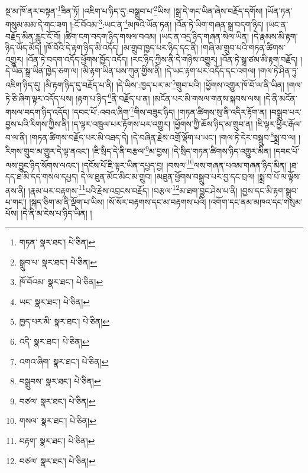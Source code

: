 སྔ་མ་ཁོ་ནར་བསྟན་\footnote{གཏན་  སྣར་ཐང་།  པེ་ཅིན། }ཟིན་ཏོ། །འཇིག་པ་ཉིད་དུ་:བསྒྲུབ་པ་\footnote{སྒྲུབ་པ་  སྣར་ཐང་།  པེ་ཅིན། }ཡིས། །སྒྲ་དེ་གང་ཡིན་ཞེས་བརྗོད་དགོས། །ཡོན་ཏན་གསུམ་མམ་དེ་གང་ཟག །:ངོ་བོའམ་\footnote{ཁོ་བོའམ་  སྣར་ཐང་།  པེ་ཅིན། }:ཡང་ན་\footnote{ཡང་  སྣར་ཐང་།  པེ་ཅིན། }མཁའི་ཡོན་ཏན། །འོན་ཏེ་ཡིག་གཞན་སྒྲ་བདག་ཉིད། །ཡང་ན་བརྗོད་མིན་རླུང་ངོ་བོ། །ཚིག་ངག་བདག་ཉིད་གསལ་བའམ། །ཡང་ན་འདྲ་ཉིད་གཞན་སེལ་ཡིན། །དེ་རྣམས་མི་རྟག་ཉིད་ཡོད་མོད། །ཁོ་བོའི་དེ་རྟག་ཉིད་མི་འདོད། །མ་གྲུབ་ཁྱད་པར་ཉིད་དང་ནི། །གཞི་མ་གྲུབ་པའི་གཏན་ཚིགས་འགྱུར། །འོན་ཏེ་བདག་འདོད་ཕྱོགས་ཁྱོད་འདོད། །རང་ཉིད་ཀྱིས་ནི་དེ་གཉིས་འགྱུར། །འོན་ཏེ་སྒྲ་ཙམ་མི་རྟག་བརྗོད། །དེ་ཡིན་སྒྲ་ཡིན་ཁྱེད་ཅག་ལ། །མི་རྟག་ཡིན་པས་ཀུན་གྱིས་ནི། །དེ་ཡང་རྟག་པར་འདོད་དང་འགལ། །གལ་ཏེ་ཤིན་ཏུ་འཇིག་ཉིད་དུ། །མི་རྟག་ཉིད་དུ་བརྗོད་པ་ནི། །དེ་ཡིས་:ཁྱད་པར་མ་\footnote{ཁྱད་པར་མི་  སྣར་ཐང་།  པེ་ཅིན། }གྲུབ་པའི། །ཕྱོགས་འགྱུར་ཁོ་བོ་ལ་ནི་ཡིན། །གལ་ཏེ་ཅི་ཞིག་ལྟར་འདོད་པས། །རྟག་པ་ཉིད་\footnote{འདི་  སྣར་ཐང་།  པེ་ཅིན། }ནི་བརྗོད་པ་ན། །མངོན་པར་མི་གསལ་གནས་སྐབས་ལས། །དེ་ནི་མངོན་གསལ་བདག་ཉིད་འདོད། །དབང་པོ་:འབའ་ཞིག་\footnote{འགའ་ཞིག་  སྣར་ཐང་།  པེ་ཅིན། }གིས་བཟུང་ཉིད། །གཏན་ཚིགས་སུ་ནི་འདིར་རྟོག་ན། །བསྒྲུབ་པར་བྱས་པའི་རིགས་ཀྱིས་ནི། །ད་ལྟར་འཁྲུལ་པར་རྟོགས་པར་འགྱུར། །ཕྱོགས་ཀྱི་ཆོས་ཉིད་མ་གྲུབ་ན། །ཇི་ལྟར་ཕྱིར་རྒོལ་བ་ལ་ནི། །གཏན་ཚིགས་བརྗོད་པར་མི་འཐད་དེ། །དེ་བཞིན་རྗེས་འགྲོ་ལྡོག་པ་ཡང་། །གལ་ཏེ་དེར་བསྒྲུབ་\footnote{བསྒྲུབས་  སྣར་ཐང་།  པེ་ཅིན། }སྨྲ་བ་ལ། །རིགས་གྲུབ་མ་གྱུར་དེ་ལྟ་ནའང་། །ཇི་སྲིད་དེ་ནི་བརྩལ་\footnote{བཙལ་  སྣར་ཐང་།  པེ་ཅིན། }མ་བྱས། །དེ་སྲིད་གཏན་ཚིགས་ཉིད་འགྱུར་མིན། །དབང་པོ་ལས་བྱུང་ཉིད་སོགས་ལའང་། །དངོས་པོ་ཇི་ལྟར་ཡིན་དཔྱད་བྱ། །བསལ་\footnote{གསལ་  སྣར་ཐང་།  པེ་ཅིན། }ལས་གཞན་པའམ་གཞན་ཉིད་མིན། །ཐ་དད་ཐ་མི་དད་གསལ་དཔྱད། དེ་ལ་ཐུན་མོང་མིང་མ་གྲུབ། །མཐུན་ཕྱོགས་བསྒྲུབ་པར་བྱ་དང་བྲལ། །སྨྲ་བ་པོ་ལ་ལྟོས་ནས་ནི། །རྣམ་པར་བརྟགས་\footnote{བརྟག་  སྣར་ཐང་།  པེ་ཅིན། }པའི་རྗེས་འབྲངས་བརྗོད། །བརྩལ་\footnote{བཙལ་  སྣར་ཐང་།  པེ་ཅིན། }མ་ཐག་བྱུང་ཤེས་པ་ནི། །བྱས་དང་མི་རྟག་སྒྲུབ་པ་གང་། །སྐད་ཅིག་མ་ནི་ལྡོག་པ་ཡིས། །སོ་སོར་བརྟགས་དང་མ་བརྟགས་པའི། །འགོག་དང་ནམ་མཁའ་དང་གསུམ་པོས། །དེ་ནི་མ་ངེས་པ་ཉིད་ཡིན། །
